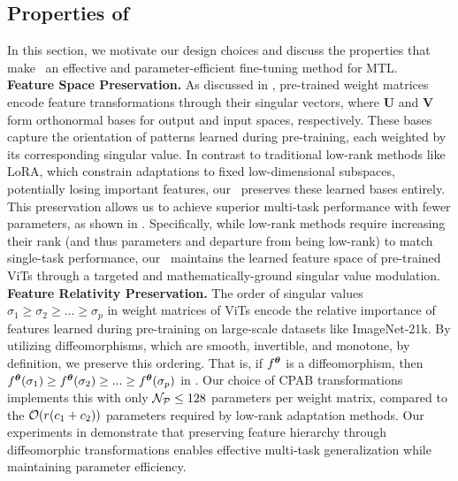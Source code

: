 \subsection{Properties of \ourmethod}
\label{subsec:theory}
In this section, we motivate our design choices and discuss the properties that make \ourmethod\ an effective and parameter-efficient fine-tuning method for MTL.
\\
\noindent\textbf{Feature Space Preservation.} As discussed in , pre-trained weight matrices encode feature transformations through their singular vectors, where $\mathbf{U}$ and $\mathbf{V}$ form orthonormal bases for output and input spaces, respectively. These bases capture the orientation of patterns learned during pre-training, each weighted by its corresponding singular value. In contrast to traditional low-rank methods like LoRA, which constrain adaptations to fixed low-dimensional subspaces, potentially losing important features, our \ourmethod\ preserves these learned bases entirely. This preservation allows us to achieve superior multi-task performance with fewer parameters, as shown in . Specifically, while low-rank methods require increasing their rank (and thus parameters and departure from being low-rank) to match single-task performance, our \ourmethod\ maintains the learned feature space of pre-trained ViTs through a targeted and mathematically-ground singular value modulation.
\\
\noindent\textbf{Feature Relativity Preservation.} The order of singular values $\sigma_1 \geq \sigma_2 \geq \ldots \geq \sigma_p$ in weight matrices of ViTs encode the relative importance of features learned during pre-training on large-scale datasets like ImageNet-21k. By utilizing diffeomorphisms, which are smooth, invertible, and monotone, by definition, we preserve this ordering. That is, if $f^{{\bm{\theta}}}$ is a diffeomorphism, then $f^{{\bm{\theta}}}(\sigma_1) \geq f^{{\bm{\theta}}}(\sigma_2) \geq ... \geq f^{{\bm{\theta}}}(\sigma_p)$ in . Our choice of CPAB transformations implements this with only ${\mathcal{N}}_{\mathcal{P}} \leq 128$ parameters per weight matrix, compared to the ${\mathcal{O}}(r(c_1 + c_2))$ parameters required by low-rank adaptation methods. Our experiments in  demonstrate that preserving feature hierarchy through diffeomorphic transformations enables effective multi-task generalization while maintaining parameter efficiency.

